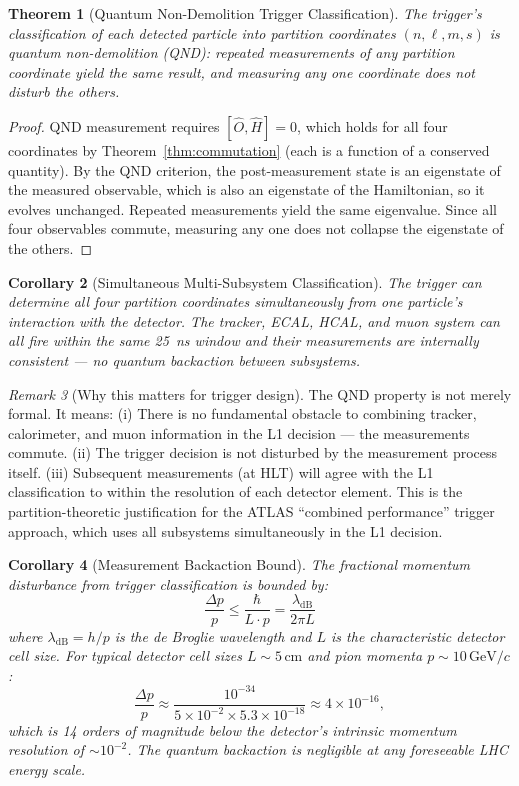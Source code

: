 \documentclass[twocolumn,10pt,a4paper]{article}
\theoremstyle{thmstyle}
\newtheorem{theorem}{Theorem}[section]
\newtheorem{corollary}[theorem]{Corollary}
\theoremstyle{definition}
\theoremstyle{remark}
\newtheorem{remark}[theorem]{Remark}
\begin{document}
\begin{theorem}[Quantum Non-Demolition Trigger Classification]
\label{thm:qnd}
The trigger's classification of each detected particle into partition
coordinates $(n, \ell, m, s)$ is quantum non-demolition (QND):
repeated measurements of any partition coordinate yield the same result,
and measuring any one coordinate does not disturb the others.
\end{theorem}

\begin{proof}
QND measurement requires $[\hat{O}, \hat{H}] = 0$, which holds for all
four coordinates by Theorem~\ref{thm:commutation} (each is a function of
a conserved quantity). By the QND criterion, the post-measurement state
is an eigenstate of the measured observable, which is also an eigenstate
of the Hamiltonian, so it evolves unchanged. Repeated measurements yield
the same eigenvalue. Since all four observables commute, measuring any
one does not collapse the eigenstate of the others.
\end{proof}

\begin{corollary}[Simultaneous Multi-Subsystem Classification]
\label{cor:simultaneous}
The trigger can determine all four partition coordinates simultaneously
from one particle's interaction with the detector. The tracker, ECAL, HCAL,
and muon system can all fire within the same 25~ns window and their
measurements are internally consistent — no quantum backaction between
subsystems.
\end{corollary}

\begin{remark}[Why this matters for trigger design]
The QND property is not merely formal. It means:
(i) There is no fundamental obstacle to combining tracker, calorimeter, and
muon information in the L1 decision — the measurements commute.
(ii) The trigger decision is not disturbed by the measurement process itself.
(iii) Subsequent measurements (at HLT) will agree with the L1 classification
to within the resolution of each detector element.
This is the partition-theoretic justification for the ATLAS
``combined performance'' trigger approach, which uses all subsystems
simultaneously in the L1 decision.
\end{remark}

\begin{corollary}[Measurement Backaction Bound]
\label{cor:backaction}
The fractional momentum disturbance from trigger classification is bounded by:
\begin{equation}
\frac{\Delta p}{p} \leq \frac{\hbar}{L \cdot p}
= \frac{\lambda_{\mathrm{dB}}}{2\pi L}
\end{equation}
where $\lambda_{\mathrm{dB}} = h/p$ is the de Broglie wavelength and $L$
is the characteristic detector cell size.
For typical detector cell sizes $L \sim 5\,\mathrm{cm}$ and pion momenta
$p \sim 10\,\mathrm{GeV}/c$:
\[
\frac{\Delta p}{p}
\approx \frac{10^{-34}}{5\times 10^{-2} \times 5.3\times 10^{-18}}
\approx 4 \times 10^{-16},
\]
which is 14 orders of magnitude below the detector's intrinsic momentum
resolution of $\sim 10^{-2}$. The quantum backaction is negligible at any
foreseeable LHC energy scale.
\end{corollary}
\end{document}
